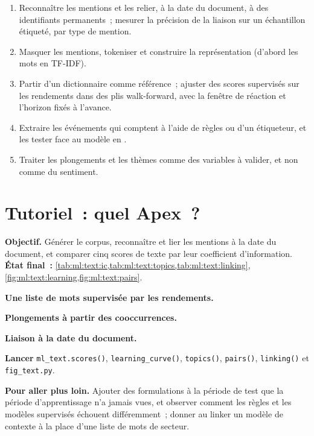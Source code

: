 \begin{method}\label{met:ml:text:method}
\begin{enumerate}
\item Reconnaître les mentions et les relier, à la date du document, à des identifiants permanents~; mesurer la précision de la liaison sur un
échantillon étiqueté, par type de mention.
\item Masquer les mentions, tokeniser et construire la représentation (d'abord les mots en TF-IDF).
\item Partir d'un dictionnaire comme référence~; ajuster des scores supervisés sur les rendements dans des plis walk-forward, avec la fenêtre de réaction
et l'horizon fixés à l'avance.
\item Extraire les événements qui comptent à l'aide de règles ou d'un étiqueteur, et les tester face au modèle en .
\item Traiter les plongements et les thèmes comme des variables à valider, et non comme du sentiment.
\end{enumerate}
\end{method}

\section{Tutoriel~: quel Apex~?}\label{tut:ml:text-from-bag-of-words-to-embeddings:tut}

\begin{tutorial}
\textbf{Objectif.} Générer le corpus, reconnaître et lier les mentions à la date du document, et comparer cinq scores de texte par leur
coefficient d'information. \textbf{État final~:} \cref{tab:ml:text:ic,tab:ml:text:topics,tab:ml:text:linking},
\cref{fig:ml:text:learning,fig:ml:text:pairs}.
\begin{tutsteps}
\item \textbf{Une liste de mots supervisée par les rendements.}
\label{lst:ml:text:supervised}
\item \textbf{Plongements à partir des cooccurrences.}
\label{lst:ml:text:ppmi}
\item \textbf{Liaison à la date du document.}
\label{lst:ml:text:link}
\item \textbf{Lancer} \texttt{ml\_text.scores()}, \texttt{learning\_curve()}, \texttt{topics()}, \texttt{pairs()},
\texttt{linking()} et \texttt{fig\_text.py}.
\end{tutsteps}
\textbf{Pour aller plus loin.} Ajouter des formulations à la période de test que la période d'apprentissage n'a jamais vues, et observer comment les règles et
les modèles supervisés échouent différemment~; donner au linker un modèle de contexte à la place d'une liste de mots de secteur.
\end{tutorial}

